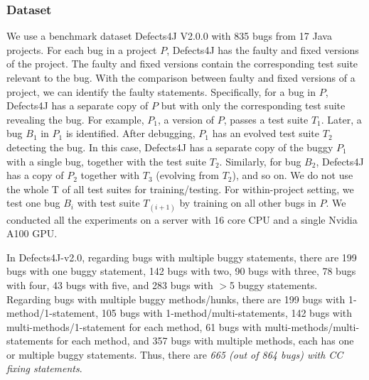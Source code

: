\subsubsection{Dataset}


We use a benchmark dataset Defects4J V2.0.0 \cite{defects4j} with 835
bugs from 17 Java projects. For each bug in a project $P$, Defects4J
has the faulty and fixed versions of the project. The faulty and fixed
versions contain the corresponding test suite relevant to the
bug. With the  comparison between faulty and fixed versions
of a project, we can identify the faulty statements. Specifically, for
a bug in $P$, Defects4J has a separate copy of $P$ but with only the
corresponding test suite revealing the bug. For example, $P_1$, a
version of $P$, passes a test suite $T_1$. Later, a bug $B_1$ in $P_1$
is identified. After debugging, $P_1$ has an evolved test suite $T_2$
detecting the bug. In this case, Defects4J has a separate copy of the
buggy $P_1$ with a single bug, together with the test suite
$T_2$. Similarly, for bug $B_2$, Defects4J has a copy of $P_2$
together with $T_3$ (evolving from $T_2$), and so on. We do not use
the whole T of all test suites for training/testing. For
within-project setting, we test one bug $B_i$ with test suite
$T_{(i+1)}$ by training on all other bugs in $P$. We conducted all the
experiments on a server with 16 core CPU and a single Nvidia A100 GPU.

In Defects4J-v2.0, regarding bugs with multiple buggy statements,
there are 199 bugs with one buggy statement, 142 bugs with two, 90
bugs with three, 78 bugs with four, 43 bugs with five, and 283 bugs
with $>$5 buggy statements. Regarding bugs with multiple buggy
methods/hunks, there are 199 bugs with 1-method/1-statement, 105 bugs
with 1-method/multi-statements, 142 bugs with
multi-methods/1-statement for each method, 61 bugs with
multi-methods/multi-statements for each method, and 357 bugs with
multiple methods, each has one or multiple buggy
statements. Thus, there are {\em 665 (out of 864 bugs) with CC fixing
statements}.





	
	

